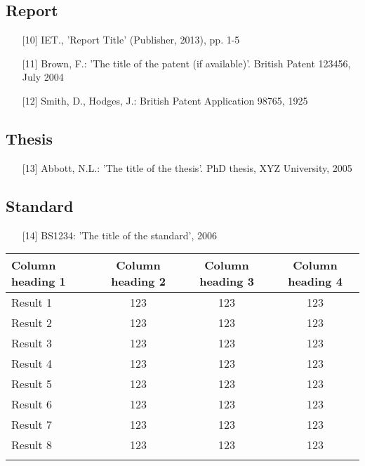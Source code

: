\documentclass{cta-author}
\begin{document}
\subsection{Report}\label{subsec13.6}

\begin{enumerate}
\item[{[10]}] IET., 'Report Title' (Publisher, 2013), pp. 1-5\vspace*{6pt}

\item[{[11]}] Brown, F.: 'The title of the patent (if available)'. British Patent
123456, July\vadjust{\pagebreak} 2004

\item[{[12]}] Smith, D., Hodges, J.: British Patent Application 98765, 1925
\end{enumerate}

\subsection{Thesis}\label{subsec13.7}

\begin{enumerate}
\item[{[13]}]
Abbott, N.L.: 'The title of the thesis'. PhD thesis, XYZ University,
2005
\end{enumerate}

\subsection{Standard}\label{subsec13.8}

\begin{enumerate}
\item[{[14]}] BS1234: 'The title of the standard', 2006
\end{enumerate}

\begin{table}[!h]
{\begin{tabular*}{\textwidth}{@{\extracolsep{\fill}}lccc}\toprule
Column heading 1 &Column heading 2 & Column heading 3  & Column heading 4\\
\midrule
Result 1 &123 &123 & 123 \\
Result 2 &123 &123 &123 \\
Result 3 &123 &123 &123 \\
Result 4 &123 &123 &123 \\
Result 5 &123 &123 &123 \\
Result 6 &123 &123 &123 \\
Result 7 &123 &123 &123 \\
Result 8 &123 &123 &123 \\
\botrule
\end{tabular*}}{}
\end{table}
\end{document}
